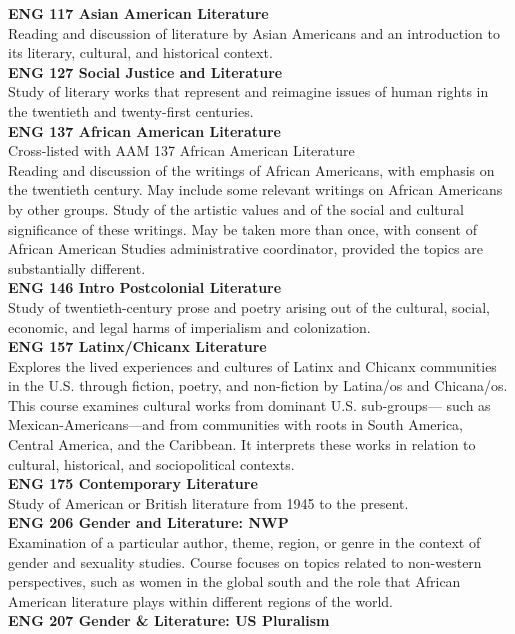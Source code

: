 \documentclass[
  letterpaper,
]{scrbook}
\begin{document}
\textbf{ENG 117 Asian American Literature}\\
Reading and discussion of literature by Asian Americans and an
introduction to its literary, cultural, and historical context.\\
\textbf{ENG 127 Social Justice and Literature}\\
Study of literary works that represent and reimagine issues of human
rights in the twentieth and twenty-first centuries.\\
\textbf{ENG 137 African American Literature}\\
Cross-listed with AAM 137 African American Literature\\
Reading and discussion of the writings of African Americans, with
emphasis on the twentieth century. May include some relevant writings on
African Americans by other groups. Study of the artistic values and of
the social and cultural significance of these writings. May be taken
more than once, with consent of African American Studies administrative
coordinator, provided the topics are substantially different.\\
\textbf{ENG 146 Intro Postcolonial Literature}\\
Study of twentieth-century prose and poetry arising out of the cultural,
social, economic, and legal harms of imperialism and colonization.\\
\textbf{ENG 157 Latinx/Chicanx Literature}\\
Explores the lived experiences and cultures of Latinx and Chicanx
communities in the U.S. through fiction, poetry, and non-fiction by
Latina/os and Chicana/os. This course examines cultural works from
dominant U.S. sub-groups--- such as Mexican-Americans---and from
communities with roots in South America, Central America, and the
Caribbean. It interprets these works in relation to cultural,
historical, and sociopolitical contexts.\\
\textbf{ENG 175 Contemporary Literature}\\
Study of American or British literature from 1945 to the present.\\
\textbf{ENG 206 Gender and Literature: NWP}\\
Examination of a particular author, theme, region, or genre in the
context of gender and sexuality studies. Course focuses on topics
related to non-western perspectives, such as women in the global south
and the role that African American literature plays within different
regions of the world.\\
\textbf{ENG 207 Gender \& Literature: US Pluralism}\\
\end{document}
